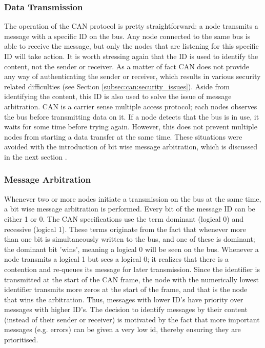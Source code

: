 \subsubsection{Data Transmission}
\label{subsec:can:data_transmission}

The operation of the CAN protocol is pretty straightforward: a node transmits a message with a specific ID on the bus. Any node connected to the same bus is able to receive the message, but only the nodes that are listening for this specific ID will take action. It is worth stressing again that the ID is used to identify the content, not the sender or receiver. As a matter of fact CAN does not provide any way of authenticating the sender or receiver, which results in various security related difficulties (see Section \ref{subsec:can:security_issues}). Aside from identifying the content, this ID is also used to solve the issue of message arbitration. CAN is a carrier sense multiple access protocol; each nodes observes the bus before transmitting data on it. If a node detects that the bus is in use, it waits for some time before trying again. However, this does not prevent multiple nodes from starting a data transfer at the same time. These situations were avoided with the introduction of bit wise message arbitration, which is discussed in the next section \cite{CANarbitration}.

\subsubsection{Message Arbitration}
\label{subsec:can:message_arbitration}

Whenever two or more nodes initiate a transmission on the bus at the same time, a bit wise message arbitration is performed. Every bit of the message ID can be either 1 or 0. The CAN specifications use the term dominant (logical 0) and recessive (logical 1). These terms originate from the fact that whenever more than one bit is simultaneously written to the bus, and one of these is dominant; the dominant bit 'wins', meaning a logical 0 will be seen on the bus. Whenever a node transmits a logical 1 but sees a logical 0; it realizes that there is a contention and re-queues its message for later transmission. Since the identifier is transmitted at the start of the CAN frame, the node with the numerically lowest identifier transmits more zeros at the start of the frame, and that is the node that wins the arbitration. Thus, messages with lower ID's have priority over messages with higher ID's. The decision to identify messages by their content (instead of their sender or receiver) is motivated by the fact that more important messages (e.g. errors) can be given a very low id, thereby ensuring they are prioritised. 

